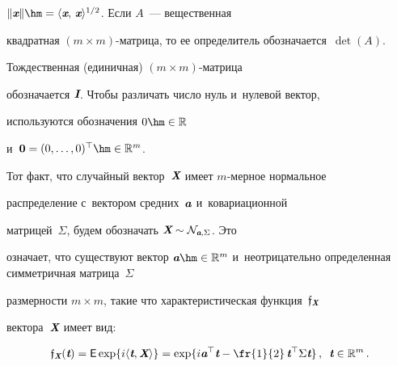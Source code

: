 $\|\vx\|\hm=\langle\vx,\,\vx\rangle^{1/2}$. Если $A$~--- вещественная


квадратная $(m\times m)$-мат\-ри\-ца, то ее определитель обозначается~$\det(A)$.


Тождественная (единичная) $(m\times m)$-мат\-ри\-ца


обозначается $\emph{\textbf{I}}$. Чтобы различать число нуль и~нулевой вектор,


используются обозначения $0\hm\in\mathbb{R}$


и~$\bO=(0,\ldots,0)^{\top}\hm\in\mathbb{R}^m$.





Тот факт, что случайный вектор~$\emph{\textbf{X}}$ имеет $m$-мер\-ное нормальное


распределение с~вектором средних~$\emph{\textbf{a}}$ и~ковариационной


матрицей~$\Sigma$, будем обозначать $\emph{\textbf{X}}\sim\mathcal{N}_{\emph{\textbf{a}},\Sigma}$. Это


означает, что существуют вектор $\va \hm\in \mathbb{R}^m$ и~неотрицательно определенная симметричная матрица~$\Sigma$


размерности $m \times m$, такие что характеристическая функция~$\mathfrak{f}_{\emph{\textbf{X}}}$


вектора~$\emph{\textbf{X}}$ имеет вид:





\noindent


$$


\mathfrak{f}_{\vX}(\vt)={\sf E}\exp\{i\langle


\vt,\vX\rangle\}=\exp\{i\va^{\top}\vt-\fr{1}{2}\,\vt^{\top}


\Sigma\vt\}\,,\enskip \vt\in \mathbb{R}^m\,.


$$





